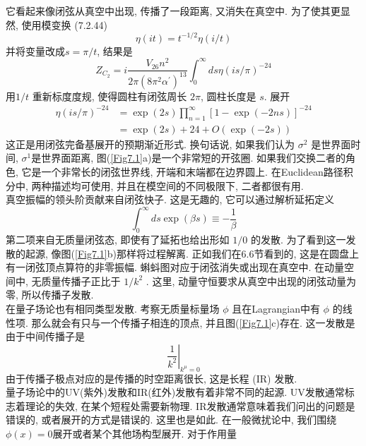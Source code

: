 它看起来像闭弦从真空中出现, 传播了一段距离, 又消失在真空中. 为了使其更显然, 使用模变换 (7.2.44)
\begin{equation}
	\eta(i t)=t^{-1 / 2} \eta(i / t)
\end{equation}
并将变量改成$s=\pi / t$, 结果是
\begin{equation}
	Z_{C_{2}}=i \frac{V_{26} n^{2}}{2 \pi\left(8 \pi^{2} \alpha^{\prime}\right)^{13}} \int_{0}^{\infty} d s \eta(i s / \pi)^{-24}
\end{equation}
用$1 / t$ 重新标度度规, 使得圆柱有闭弦周长 $2 \pi$, 圆柱长度是 $s $. 展开
\begin{equation}
	\begin{aligned}
		\eta(i s / \pi)^{-24} &=\exp (2 s) \prod_{n=1}^{\infty}[1-\exp (-2 n s)]^{-24} \\
		&=\exp (2 s)+24+O(\exp (-2 s))
	\end{aligned}
\end{equation}
这正是用闭弦完备基展开的预期渐近形式. 换句话说, 如果我们认为 $\sigma^{2}$ 是世界面时间,  $\sigma^{1}$是世界面距离, 图(\ref{Fig7.1}a)是一个非常短的开弦圈. 如果我们交换二者的角色, 它是一个非常长的闭弦世界线, 开端和末端都在边界圆上. 在Euclidean路径积分中, 两种描述均可使用, 并且在模空间的不同极限下, 二者都很有用.\\
真空振幅的领头阶贡献来自闭弦快子. 这是无趣的, 它可以通过解析延拓定义
\begin{equation}
	\int_{0}^{\infty} d s \exp (\beta s) \equiv-\frac{1}{\beta}
\end{equation}
第二项来自无质量闭弦态, 即使有了延拓也给出形如 $1 / 0$ 的发散. 为了看到这一发散的起源, 像图(\ref{Fig7.1}b)那样将过程解离. 正如我们在6.6节看到的, 这是在圆盘上有一闭弦顶点算符的非零振幅. 蝌蚪图对应于闭弦消失或出现在真空中. 在动量空间中, 无质量传播子正比于 $1 / k^{2} $ . 这里, 动量守恒要求从真空中出现的闭弦动量为零, 所以传播子发散.\\
在量子场论也有相同类型发散. 考察无质量标量场 $\phi$ 且在Lagrangian中有 $\phi$ 的线性项. 那么就会有只与一个传播子相连的顶点, 并且图(\ref{Fig7.1}c)存在. 这一发散是由于中间传播子是
\begin{equation}
	\left.\frac{1}{k^{2}}\right|_{k^{\mu}=0}
\end{equation}
由于传播子极点对应的是传播的时空距离很长, 这是长程 (IR) 发散.\\
量子场论中的UV(紫外)发散和IR(红外)发散有着非常不同的起源. UV发散通常标志着理论的失效, 在某个短程处需要新物理. IR发散通常意味着我们问出的问题是错误的, 或者展开的方式是错误的. 这里也是如此. 在一般微扰论中, 我们围绕 $\phi(x)=0$展开或者某个其他场构型展开. 对于作用量
